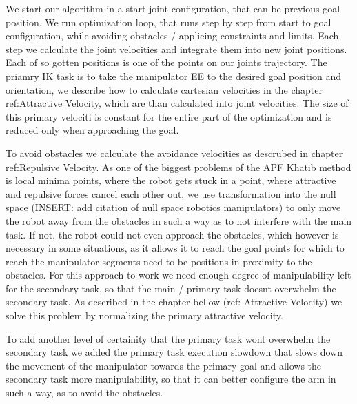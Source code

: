 \documentclass[]{article}
\begin{document}
We start our algorithm in a start joint configuration, that can be previous goal position. We run optimization loop, that runs step by step from start to goal configuration, while avoiding obstacles / applieing constraints and limits. Each step we calculate the joint velocities and integrate them into new joint positions. Each of so gotten positions is one of the points on our joints trajectory. The priamry IK task is to take the manipulator EE to the desired goal position and orientation, we describe how to calculate cartesian velocities in the chapter ref:Attractive Velocity, which are than calculated into joint velocities. The size of this primary velociti is constant for the entire part of the optimization and is reduced only when approaching the goal. 

To avoid obstacles we calculate the avoidance velocities as descrubed in chapter ref:Repulsive Velocity. As one of the biggest problems of the APF Khatib method is local minima points, where the robot gets stuck in a point, where attractive and repulsive forces cancel each other out, we use transformation into the null space (INSERT: add citation of null space robotics manipulators) to only move the robot away from the obstacles in such a way as to not interfere with the main task. If not, the robot could not even approach the obstacles, which however is necessary in some situations, as it allows it to reach the goal points for which to reach the manipulator segments need to be positions in proximity to the obstacles. For this approach to work we need enough degree of manipulability left for the secondary task, so that the main / primary task doesnt overwhelm the secondary task. As described in the chapter bellow (ref: Attractive Velocity) we solve this problem by normalizing the primary attractive velocity. 


To add another level of certainity that the primary task wont overwhelm the secondary task we added the primary task execution slowdown that slows down the movement of the manipulator towards the primary goal and allows the secondary task more manipulability, so that it can better configure the arm in such a way, as to avoid the obstacles. 





\end{document}
